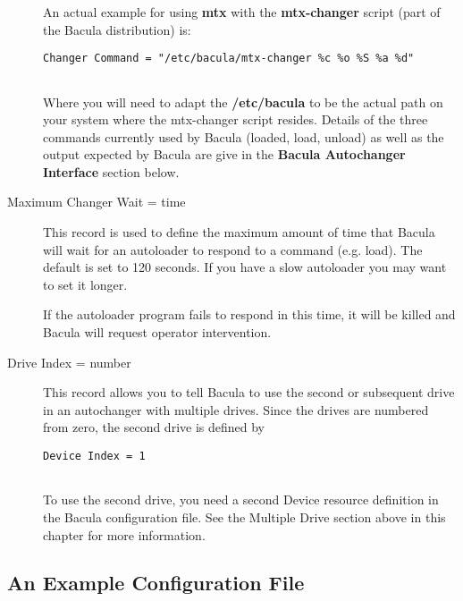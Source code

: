 \begin{description}
\begin{verbatim}
\end{verbatim}
\normalsize

An actual example for using {\bf mtx} with the  {\bf mtx-changer} script (part
of the Bacula distribution) is:  

\footnotesize
\begin{verbatim}
Changer Command = "/etc/bacula/mtx-changer %c %o %S %a %d"
    
\end{verbatim}
\normalsize

Where you will need to adapt the {\bf /etc/bacula} to be  the actual path on
your system where the mtx-changer script  resides.  Details of the three
commands currently used by Bacula  (loaded, load, unload) as well as the
output expected by  Bacula are give in the {\bf Bacula Autochanger Interface} 
section below.  

\item [Maximum Changer Wait = \lt{}time\gt{}]
   This record is used to define the maximum amount of time  that Bacula will
wait for an autoloader to respond  to a command (e.g. load). The default is
set to 120 seconds.  If you have a slow autoloader you may want to set it
longer.  

If the autoloader program fails to respond in this time, it  will be killed
and Bacula will request operator intervention.  

\item [Drive Index = \lt{}number\gt{}]
   This record allows you to tell Bacula to use the second  or subsequent drive
in an autochanger with multiple drives.  Since the drives are numbered from
zero, the second drive is defined by  

\footnotesize
\begin{verbatim}
Device Index = 1
      
\end{verbatim}
\normalsize

To use the second drive, you need a second Device resource definition  in the
Bacula configuration file. See the Multiple Drive section above  in this
chapter for more information. 
\end{description}

\label{example}

\subsection*{An Example Configuration File}

